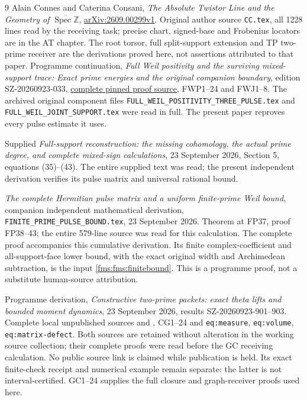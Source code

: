 \documentclass[11pt,a4paper]{article}
\theoremstyle{definition}\newtheorem{definition}[theorem]{Definition}
\newcommand{\Z}{\mathbb Z}\newcommand{\Q}{\mathbb Q}
\newcommand{\Spec}{\operatorname{Spec}}\newcommand{\SpecMon}{\operatorname{Spec}_{\mathrm{mon}}}
\begin{document}
\begin{thebibliography}{9}
Alain Connes and Caterina Consani, \emph{The Absolute Twistor Line and
the Geometry of $\overline{\Spec\Z}$},
\href{https://arxiv.org/abs/2609.00299v1}{arXiv:2609.00299v1}.
Original author source \texttt{CC.tex}, all 1228 lines read by the receiving
task; precise chart, signed-base and Frobenius locators are in the AT chapter.
The root torsor, full split-support extension and TP two-prime receiver are
the derivations proved here, not assertions attributed to that paper.
Programme continuation, \emph{Full Weil positivity and the
surviving mixed-support trace: Exact prime energies and the original
companion boundary}, edition SZ-20260923-033,
\href{https://github.com/KokunoYumeto/zeta-function-research-reader/blob/3c78cfbd9e194d35117b33277c421c6564ce3dbf/workbenches/splitzero-tandem/continuations/20260923-full-prime-support/033/MIXED_PRIME_ENERGY_AND_BOUNDARY.tex}{complete pinned proof source},
FWP1--24 and FWJ1--8. The archived original component files
\texttt{FULL\_WEIL\_POSITIVITY\_THREE\_PULSE.tex} and
\texttt{FULL\_WEIL\_JOINT\_SUPPORT.tex} were read in full.
The present paper reproves every pulse estimate it uses.


Supplied \emph{Full-support reconstruction: the missing cohomology,
the actual prime degree, and complete mixed-sign calculations},
23 September 2026, Section 5, equations (35)--(43).
The entire supplied text was read; the present independent
derivation verifies its pulse matrix and universal rational bound.


\emph{The complete Hermitian pulse matrix and a uniform finite-prime
Weil bound}, companion independent mathematical derivation,
\texttt{FINITE\_PRIME\_PULSE\_BOUND.tex}, 23 September 2026.
Theorem at FP37, proof FP38--43; the entire 579-line source was
read for this calculation. The complete proof accompanies this
cumulative derivation. Its finite complex-coefficient and
all-support-face lower bound, with the exact original width and
Archimedean subtraction, is the input \eqref{fms:fms:finitebound}.
This is a programme proof, not a substitute human-source attribution.

Programme derivation, \emph{Constructive two-prime packets: exact theta
lifts and bounded moment dynamics}, 23 September 2026,
results SZ-20260923-901--903. Complete local unpublished sources
 and , CG1--24 and
\texttt{eq:measure}, \texttt{eq:volume}, \texttt{eq:matrix-defect}.
Both sources are retained without alteration in the working source
collection; their complete proofs were read before the GC receiving
calculation. No public source link is claimed while publication is held.
Its exact finite-check receipt and numerical example remain separate:
the latter is not interval-certified. GC1--24 supplies the full closure
and graph-receiver proofs used here.


\end{thebibliography}
\end{document}
